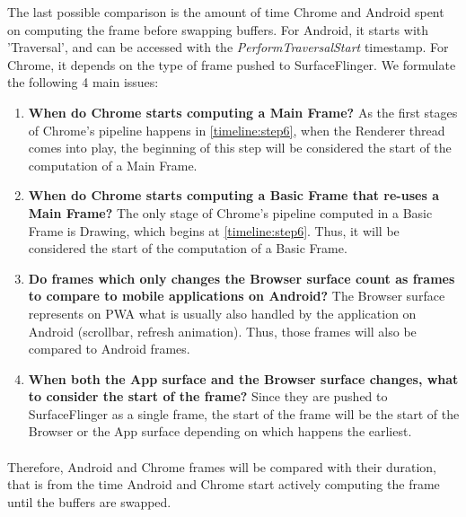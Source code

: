 \documentclass{kththesis}
\begin{document}
The last possible comparison is the amount of time Chrome and Android spent on computing the frame before swapping buffers. For Android, it starts with 'Traversal', and can be accessed with the \textit{PerformTraversalStart} timestamp. For Chrome, it depends on the type of frame pushed to SurfaceFlinger. We formulate the following 4 main issues:
\begin{enumerate}
    \item \textbf{When do Chrome starts computing a Main Frame?} \newline
    As the first stages of Chrome's pipeline happens in \ref{timeline:step6}, when the Renderer thread comes into play, the beginning of this step will be considered the start of the computation of a Main Frame.
    \item \textbf{When do Chrome starts computing a Basic Frame that re-uses a Main Frame?} \newline
    The only stage of Chrome's pipeline computed in a Basic Frame is Drawing, which begins at \ref{timeline:step6}. Thus, it will be considered the start of the computation of a Basic Frame.
    \item \textbf{Do frames which only changes the Browser surface count as frames to compare to mobile applications on Android?} \newline
    The Browser surface represents on PWA what is usually also handled by the application on Android (scrollbar, refresh animation). Thus, those frames will also be compared to Android frames. 
    \item \textbf{When both the App surface and the Browser surface changes, what to consider the start of the frame?} \newline
    Since they are pushed to SurfaceFlinger as a single frame, the start of the frame will be the start of the Browser or the App surface depending on which happens the earliest.
\end{enumerate}

\paragraph{}
Therefore, Android and Chrome frames will be compared with their duration, that is from the time Android and Chrome start actively computing the frame until the buffers are swapped.

\end{document}
